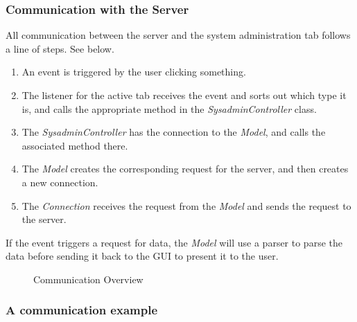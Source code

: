 \subsubsection{Communication with the Server}
\label{Communication with the Server}

All communication between the server and the system administration tab follows a line of steps. See  below.

\begin{enumerate}

  \item An event is triggered by the user clicking something.
  \item The listener for the active tab receives the event and sorts out which type it is, and calls the appropriate method in the \textit{SysadminController} class.
  \item The \textit{SysadminController} has the connection to the \textit{Model}, and calls the associated method there.
  \item The \textit{Model} creates the corresponding request for the server, and then creates a new connection.
  \item The \textit{Connection} receives the request from the \textit{Model} and sends the request to the server.


\end{enumerate}

If the event triggers a request for data, the \textit{Model} will use a parser to parse the data before sending it back to the GUI to present it to the user.


\begin{figure}[hbt!]
\caption{Communication Overview}
\label{fig:adm_com_view}
\end{figure}


\subsubsection{A communication example}
\label{Communication example}

